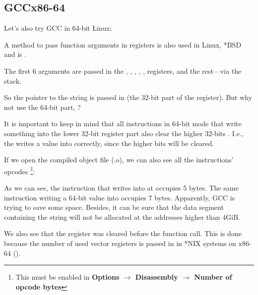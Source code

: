 \subsection{GCC\EMDASH{}x86-64}

Let's also try GCC in 64-bit Linux:



A method to pass function arguments in registers is also used in Linux, *BSD and \MacOSX is \cite{SysVABI}.

The first 6 arguments are passed in the \RDI, \RSI, \RDX, \RCX, ,   registers, and the rest---via the stack.

So the pointer to the string is passed in \EDI (the 32-bit part of the register).
But why not use the 64-bit part, \RDI?

It is important to keep in mind that all \MOV instructions in 64-bit mode that write something into the lower 32-bit register part also clear the higher 32-bits \cite{Intel}.
I.e., the  writes a value into \RAX correctly, since the higher bits will be cleared.

If we open the compiled object file (.o), we can also see all the instructions' opcodes
\footnote{This must be enabled in \textbf{Options $\rightarrow$ Disassembly $\rightarrow$ Number of opcode bytes}}:



\label{hw_EDI_instead_of_RDI}
As we can see, the instruction that writes into \EDI at  occupies 5 bytes.
The same instruction writing a 64-bit value into \RDI occupies 7 bytes.
Apparently, GCC is trying to save some space.
Besides, it can be sure that the data segment containing the string will not be allocated at the addresses higher than 4\gls{GiB}.

\label{SysVABI_input_EAX}
We also see that the \EAX register was cleared before the \printf function call.
This is done because the number of used vector registers is passed in \EAX in *NIX systems on x86-64 
(\cite{SysVABI}).


